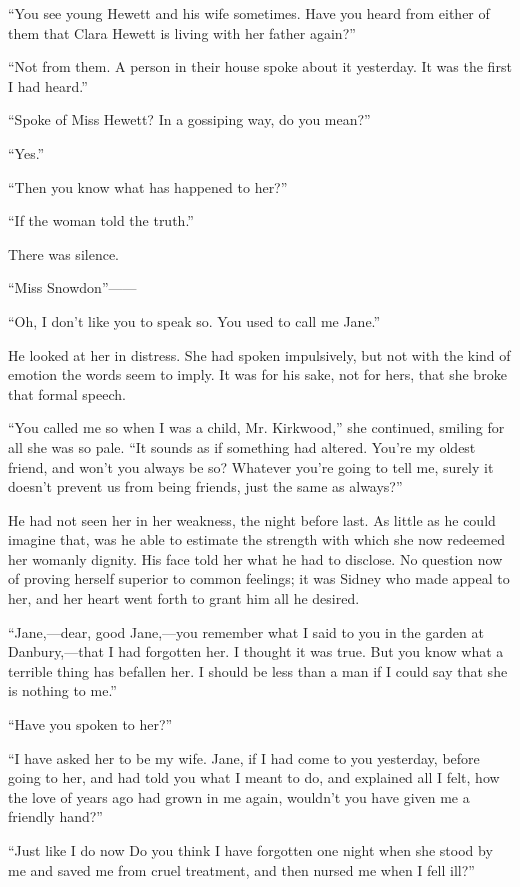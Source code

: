 ``You see young Hewett and his wife sometimes. Have you heard from
either of them that Clara Hewett is living with her father again?''

``Not from them. A person in their house spoke about it yesterday. It
was the first I had heard.''

``Spoke of Miss Hewett? In a gossiping way, do you mean?''

``Yes.''

``Then you know what has happened to her?''

``If the woman told the truth.''

There was silence.

``Miss Snowdon''{{------}}

``Oh, I don't like you to speak so. You used to call me Jane.''

He looked at her in distress. She had spoken impulsively, but not with
the kind of emotion the words seem to imply. It was for his
{\protect\hypertarget{150}{}{}}sake, not for hers, that she broke that
formal speech.

``You called me so when I was a child, Mr. Kirkwood,'' she continued,
smiling for all she was so pale. ``It sounds as if something had
altered. You're my oldest friend, and won't you always be so? Whatever
you're going to tell me, surely it doesn't prevent us from being
friends, just the same as always?''

He had not seen her in her weakness, the night before last. As little as
he could imagine that, was he able to estimate the strength with which
she now redeemed her womanly dignity. His face told her what he had to
disclose. No question now of proving herself superior to common
feelings; it was Sidney who made appeal to her, and her heart went forth
to grant him all he desired.

``Jane,---dear, good Jane,---you remember what I said to you in the
garden at Danbury,---that I had forgotten her. I thought it was true.
But you know what a terrible thing has befallen her. I should be less
than a man if I could say that she is nothing to me.''

``Have you spoken to her?''

``I have asked her to be my wife. Jane, if
{\protect\hypertarget{151}{}{}}I had come to you yesterday, before going
to her, and had told you what I meant to do, and explained all I felt,
how the love of years ago had grown in me again, wouldn't you have given
me a friendly hand?''

``Just like I do now Do you think I have forgotten one night when she
stood by me and saved me from cruel treatment, and then nursed me when I
fell ill?''

